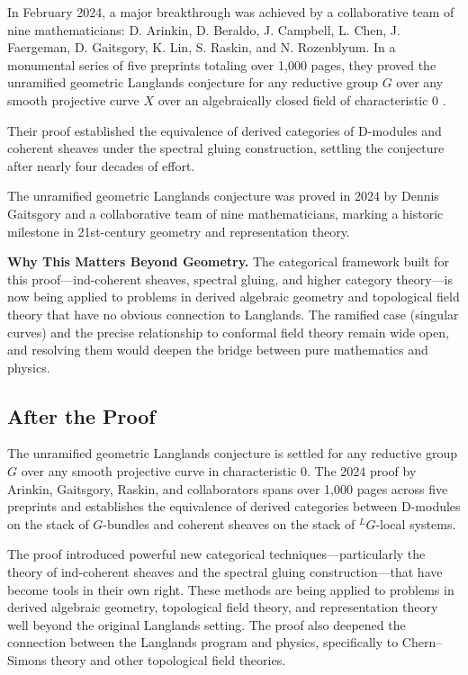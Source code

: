 In February 2024, a major breakthrough was achieved by a collaborative team of nine mathematicians: D. Arinkin, D. Beraldo, J. Campbell, L. Chen, J. Faergeman, D. Gaitsgory, K. Lin, S. Raskin, and N. Rozenblyum. In a monumental series of five preprints totaling over 1,000 pages, they proved the unramified geometric Langlands conjecture for any reductive group $G$ over any smooth projective curve $X$ over an algebraically closed field of characteristic 0 \cite{arinkin2024}.

Their proof established the equivalence of derived categories of D-modules and coherent sheaves under the spectral gluing construction, settling the conjecture after nearly four decades of effort.

\begin{highlightbox}
The unramified geometric Langlands conjecture was proved in 2024 by Dennis Gaitsgory and a collaborative team of nine mathematicians, marking a historic milestone in 21st-century geometry and representation theory.
\end{highlightbox}

\textbf{Why This Matters Beyond Geometry.} The categorical framework built for this proof---ind-coherent sheaves, spectral gluing, and higher category theory---is now being applied to problems in derived algebraic geometry and topological field theory that have no obvious connection to Langlands. The ramified case (singular curves) and the precise relationship to conformal field theory remain wide open, and resolving them would deepen the bridge between pure mathematics and physics.

\subsection{After the Proof}

The unramified geometric Langlands conjecture is settled for any reductive group $G$ over any smooth projective curve in characteristic 0. The 2024 proof by Arinkin, Gaitsgory, Raskin, and collaborators spans over 1,000 pages across five preprints and establishes the equivalence of derived categories between D-modules on the stack of $G$-bundles and coherent sheaves on the stack of ${}^L\!G$-local systems.

The proof introduced powerful new categorical techniques---particularly the theory of ind-coherent sheaves and the spectral gluing construction---that have become tools in their own right. These methods are being applied to problems in derived algebraic geometry, topological field theory, and representation theory well beyond the original Langlands setting. The proof also deepened the connection between the Langlands program and physics, specifically to Chern--Simons theory and other topological field theories.

